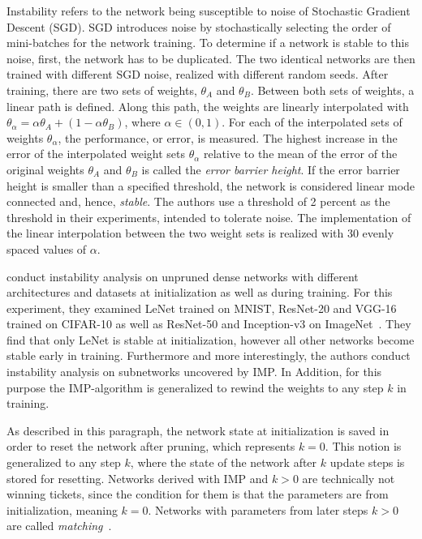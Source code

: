 Instability refers to the network being susceptible to noise of Stochastic Gradient Descent (SGD).
SGD introduces noise by stochastically selecting the order of mini-batches for the network training.
To determine if a network is stable to this noise, first, the network has to be duplicated.
The two identical networks are then trained with different SGD noise, realized with different random seeds.
After training, there are two sets of weights, $\theta_A$ and $\theta_B$.
Between both sets of weights, a linear path is defined.
Along this path, the weights are linearly interpolated with $\theta_\alpha = \alpha \theta_A + (1 - \alpha \theta_B)$, where $\alpha \in (0,1)$. 
For each of the interpolated sets of weights $\theta_\alpha$, the performance, or error, is measured.
The highest increase in the error of the interpolated weight sets $\theta_\alpha$ relative to the mean of the error of the original weights $\theta_A$ and $\theta_B$ is called the \textit{error barrier height}. 
If the error barrier height is smaller than a specified threshold, the network is considered linear mode connected and, hence, \textit{stable}.
The authors use a threshold of 2 percent as the threshold in their experiments, intended to tolerate noise. 
The implementation of the linear interpolation between the two weight sets is realized with 30 evenly spaced values of $\alpha$.

\textcite{LinearModeConnectivity} conduct instability analysis on unpruned dense networks with different architectures and datasets at initialization as well as during training.
For this experiment, they examined LeNet trained on MNIST, ResNet-20 and VGG-16 trained on CIFAR-10 as well as ResNet-50 and Inception-v3 \autocite{inceptionv3} on ImageNet~\autocite{imagenet}. 
They find that only LeNet is stable at initialization, however all other networks become stable early in training.
Furthermore and more interestingly, the authors conduct instability analysis on subnetworks uncovered by {IMP}.
In Addition, for this purpose the {IMP}-algorithm is generalized to rewind the weights to any step $k$ in training.

As described in this paragraph, the network state at initialization is saved in order to reset the network after pruning, which represents $k=0$.
This notion is generalized to any step $k$, where the state of the network after $k$ update steps is stored for resetting.
Networks derived with {IMP} and $k > 0$ are technically not winning tickets, since the condition for them is that the parameters are from initialization, meaning $k=0$.
Networks with parameters from later steps $k > 0$ are called \textit{matching}~\autocite{LinearModeConnectivity}.

